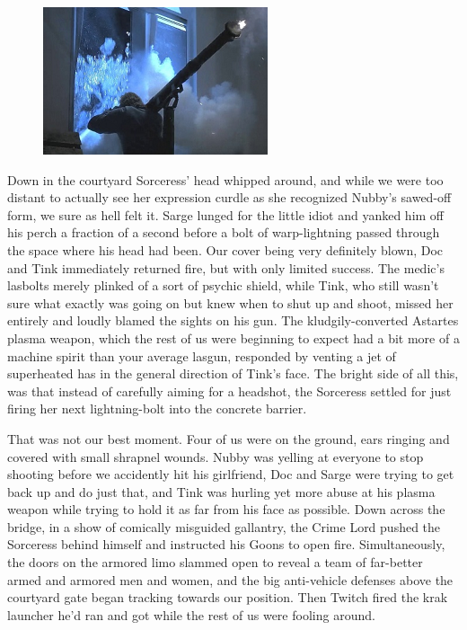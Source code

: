 \begin{figure}
	\begin{center}
		\includegraphics[width=\figwidth]{pics/18/53.png}
	\end{center}
\end{figure}
Down in the courtyard Sorceress' head whipped around, and while we were too distant to actually see her expression curdle as she recognized Nubby's sawed-off form, we sure as hell felt it. 
Sarge lunged for the little idiot and yanked him off his perch a fraction of a second before a bolt of warp-lightning passed through the space where his head had been. 
Our cover being very definitely blown, Doc and Tink immediately returned fire, but with only limited success. 
The medic's lasbolts merely plinked of a sort of psychic shield, while Tink, who still wasn't sure what exactly was going on but knew when to shut up and shoot, missed her entirely and loudly blamed the sights on his gun. 
The kludgily-converted Astartes plasma weapon, which the rest of us were beginning to expect had a bit more of a machine spirit than your average lasgun, responded by venting a jet of superheated has in the general direction of Tink's face. 
The bright side of all this, was that instead of carefully aiming for a headshot, the Sorceress settled for just firing her next lightning-bolt into the concrete barrier.

That was not our best moment. 
Four of us were on the ground, ears ringing and covered with small shrapnel wounds. 
Nubby was yelling at everyone to stop shooting before we accidently hit his girlfriend, Doc and Sarge were trying to get back up and do just that, and Tink was hurling yet more abuse at his plasma weapon while trying to hold it as far from his face as possible. 
Down across the bridge, in a show of comically misguided gallantry, the Crime Lord pushed the Sorceress behind himself and instructed his Goons to open fire. 
Simultaneously, the doors on the armored limo slammed open to reveal a team of far-better armed and armored men and women, and the big anti-vehicle defenses above the courtyard gate began tracking towards our position. 
Then Twitch fired the krak launcher he'd ran and got while the rest of us were fooling around.

